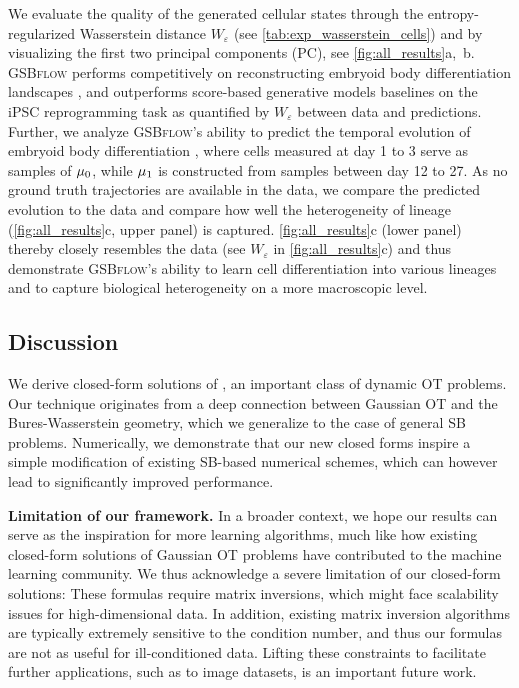  We evaluate the quality of the generated cellular states through the entropy-regularized Wasserstein distance $W_\varepsilon$
(see \cref{tab:exp_wasserstein_cells}) and by visualizing the first two principal components (PC), see \cref{fig:all_results}a,~b.
\textsc{GSBflow} performs competitively on reconstructing embryoid body differentiation landscapes \citep{moon2019visualizing}, and outperforms score-based generative models baselines on the iPSC reprogramming task \citep{schiebinger2019optimal} as quantified by $W_\varepsilon$ between data and predictions.
Further, we analyze \textsc{GSBflow}'s ability to predict the temporal evolution of embryoid body differentiation \citep{moon2019visualizing}, where cells measured at day 1 to 3 serve as samples of $\mu_0$, while $\mu_1$ is constructed from samples between day 12 to 27. As no ground truth trajectories are available in the data, we compare the predicted evolution to the data and compare how well the heterogeneity of lineage (\cref{fig:all_results}c, upper panel) is captured.
\cref{fig:all_results}c (lower panel) thereby closely resembles the data (see $W_\varepsilon$ in \cref{fig:all_results}c) and thus demonstrate \textsc{GSBflow}'s ability to learn cell differentiation into various lineages and to capture biological heterogeneity on a more macroscopic level.


\subsection{Discussion}
 We derive closed-form solutions of , an important class of dynamic \acrshort{OT} problems. Our technique originates from a deep connection between Gaussian \acrshort{OT} and the Bures-Wasserstein geometry, which we generalize to the case of general \acrshort{SB} problems. Numerically, we demonstrate that our new closed forms inspire a simple modification of existing \acrshort{SB}-based numerical schemes, which can however lead to significantly improved performance.

\textbf{Limitation of our framework. }
 In a broader context, we hope our results can serve as the inspiration for more learning algorithms, much like how existing closed-form solutions of Gaussian \acrshort{OT} problems have contributed to the machine learning community. We thus acknowledge a severe limitation of our closed-form solutions: These formulas require matrix inversions, which might face scalability issues for high-dimensional data. In addition, existing matrix inversion algorithms are typically extremely sensitive to the condition number, and thus our formulas are not as useful for ill-conditioned data. Lifting these constraints to facilitate further applications, such as to image datasets, is an important future work.
